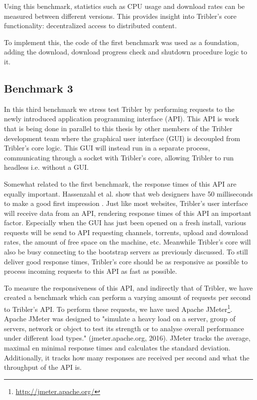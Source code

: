 Using this benchmark, statistics such as CPU usage and download rates can be measured between different versions.
This provides insight into Tribler's core functionality: decentralized access to distributed content.

To implement this, the code of the first benchmark was used as a foundation, adding the download, download progress check and shutdown procedure logic to it.

\subsection{Benchmark 3}
\label{ssct:benchmark_3}

In this third benchmark we stress test Tribler by performing requests to the newly introduced application programming interface (API).
This API is work that is being done in parallel to this thesis by other members of the Tribler development team where the graphical user interface (GUI) is decoupled from Tribler's core logic.
This GUI will instead run in a separate process, communicating through a socket with Tribler's core, allowing Tribler to run headless i.e. without a GUI.

Somewhat related to the first benchmark, the response times of this API are equally important.
Hassenzahl et al. show that web designers have 50 milliseconds to make a good first impression \cite{lindgaard2006attention}.
Just like most websites, Tribler's user interface will receive data from an API, rendering response times of this API an important factor.
Especially when the GUI has just been opened on a fresh install, various requests will be send to API requesting channels, torrents, upload and download rates, the amount of free space on the machine, etc.
Meanwhile Tribler's core will also be busy connecting to the bootstrap servers as previously discussed.
To still deliver good response times, Tribler's core should be as responsive as possible to process incoming requests to this API as fast as possible.

To measure the responsiveness of this API, and indirectly that of Tribler, we have created a benchmark which can perform a varying amount of requests per second to Tribler's API.
To perform these requests, we have used Apache JMeter\footnote{\url{http://jmeter.apache.org/}}.
Apache JMeter was designed to "simulate a heavy load on a server, group of servers, network or object to test its strength or to analyse overall performance under different load types." (jmeter.apache.org, 2016).
JMeter tracks the average, maximal en minimal response times and calculates the standard deviation.
Additionally, it tracks how many responses are received per second and what the throughput of the API is.

